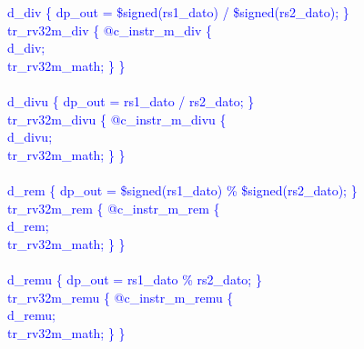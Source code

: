 \textcolor{blue}{
\indent d\_div \{ dp\_out = \$signed(rs1\_dato) / \$signed(rs2\_dato); \}\\%
\indent tr\_rv32m\_div \{ @c\_instr\_m\_div \{ \\%
\indent \hspace{\parindent} d\_div; \\%
\indent \hspace{\parindent} tr\_rv32m\_math; \} \} \\%
\\
\indent d\_divu \{ dp\_out = rs1\_dato / rs2\_dato; \}\\%
\indent tr\_rv32m\_divu \{ @c\_instr\_m\_divu \{ \\%
\indent \hspace{\parindent} d\_divu; \\%
\indent \hspace{\parindent} tr\_rv32m\_math; \} \} \\%
\\
\indent d\_rem \{ dp\_out = \$signed(rs1\_dato) \% \$signed(rs2\_dato); \}\\%
\indent tr\_rv32m\_rem \{ @c\_instr\_m\_rem \{ \\%
\indent \hspace{\parindent} d\_rem; \\%
\indent \hspace{\parindent} tr\_rv32m\_math; \} \} \\%
\\
\indent d\_remu \{ dp\_out = rs1\_dato \% rs2\_dato; \}\\%
\indent tr\_rv32m\_remu \{ @c\_instr\_m\_remu \{ \\%
\indent \hspace{\parindent} d\_remu; \\%
\indent \hspace{\parindent} tr\_rv32m\_math; \} \} \\%
}

